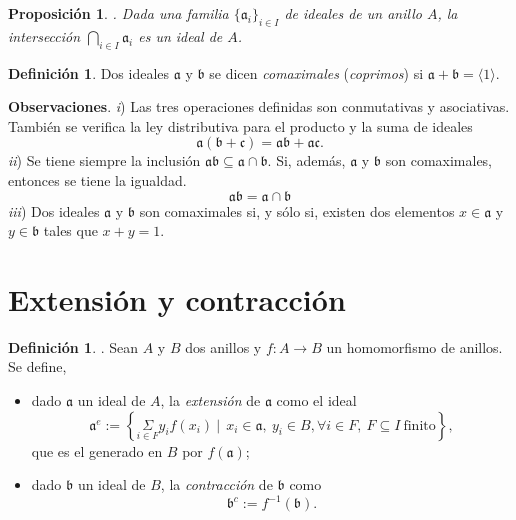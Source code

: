 \documentclass[a4paper,12pt]{article}
\newcommand{\af}{\mathfrak{a}}
\newcommand{\bfr}{\mathfrak{b}}
\newcommand{\cf}{\mathfrak{c}}
\newtheorem{proposition}[theorem]{Proposición}
\theoremstyle{definition}
\newtheorem{definition}[theorem]{Definición}
\begin{document}
\begin{proposition}. Dada una familia $\{\af_i\}_{i\in I}$ de ideales de un anillo $A$, la \textit{intersección} $\bigcap_{i\in I}\af_i$ es un ideal de $A$.
\end{proposition}

\begin{definition} Dos ideales $\af$ y $\bfr$ se dicen \textit{comaximales} (\textit{coprimos}) si $\af+\bfr=\langle 1\rangle$.
\end{definition}

\textbf{Observaciones}. \textit{i}) Las tres operaciones definidas son conmutativas y asociativas. También se verifica la ley distributiva para el producto y la suma de ideales$$\af(\bfr+\cf)=\af\bfr+\af\cf.$$
\textit{ii}) Se tiene siempre la inclusión $\af\bfr\subseteq\af\cap\bfr$. Si, además, $\af$ y $\bfr$ son comaximales, entonces se tiene la igualdad.$$\af\bfr=\af\cap\bfr$$
\textit{iii}) Dos ideales $\af$ y $\bfr$ son comaximales si, y sólo si, existen dos elementos $x\in\af$ y $y\in\bfr$ tales que $x+y=1$.

\section{Extensión y contracción}
\begin{definition}. Sean $A$ y $B$ dos anillos y $f:A\longrightarrow B$ un homomorfismo de anillos. Se define,
\begin{itemize}
    \item dado $\af$ un ideal de $A$, la \textit{extensión} de $\af$ como el ideal$$\af^e:=\left\{\underset{i\in F}{\Sigma} y_if(x_i)\ |\ \ x_i\in\af,\ y_i\in B, \forall i\in F,\ F\subseteq I\ \text{finito}\right\},$$que es el generado en $B$ por $f(\af)$;
    \item dado $\bfr$ un ideal de $B$, la \textit{contracción} de $\bfr$ como$$\bfr^c:=f^{-1}(\bfr).$$
\end{itemize}
\end{definition}
\end{document}
